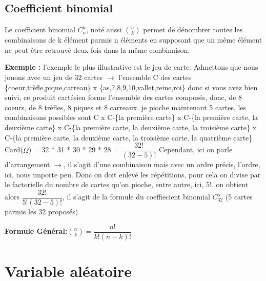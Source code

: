 \documentclass[a4paper]{article}
\begin{document}
\subsection{Coefficient binomial}

\begin{rappel}
Le coefficient binomial $C_n^k$, noté aussi ${n \choose k}$ permet de dénombrer toutes les combinaisons de k élément parmis n éléments en supposant que un même élément ne peut être retrouvé deux fois dans la même combinaison.
\end{rappel}

\textbf{Exemple :} l'exemple le plus illustrative est le jeu de carte. Admettons que nous jouons avec un jeu de 32 cartes
\newline $\rightarrow$ l'ensemble C des cartes \{coeur,trèfle,pique,carreau\} x \{as,7,8,9,10,vallet,reine,roi\}
\newline donc si vous avez bien suivi, ce produit cartésien forme l'ensemble des cartes composés, donc, de 8 coeurs, de 8 trèfles, 8 piques et 8 carreaux.
\newline je pioche maintenant 5 cartes, les combinaisons possibles sont C x C-\{la première carte\} x C-\{la première carte, la deuxième carte\} x C-\{la première carte, la deuxième carte, la troisième carte\} x C-\{la première carte, la deuxième carte, la troisième carte, la quatrième carte\}
Card($\Omega$) = 32 * 31 * 30 * 29 * 28 = $\dfrac{32!}{(32-5)!}$
Cependant, ici on parle d'arrangement $\rightarrow$, il s'agit d'une combinaison mais avec un ordre précis, l'ordre, ici, nous importe peu. Donc on doit enlevé les répétitions, pour cela on divise par le factorielle du nombre de cartes qu'on pioche, entre autre, ici, 5!.
\newline on obtient alors $\dfrac{32!}{5!(32-5)!}$, il s'agit de la formule du coeffiecient binomial $C_{32}^5$ (5 cartes parmis les 32 proposés)

\textbf{Formule Général:}$\displaystyle{{n \choose k} = \dfrac{n!}{k!(n-k)!}}$

\section{Variable aléatoire}
\end{document}
